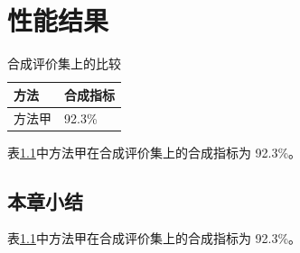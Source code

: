 \documentclass{ctexbook}
\begin{document}
\chapter{性能结果}
\begin{table}
\caption{合成评价集上的比较}
\label{tab:syn}
\begin{tabular}{ll}
方法 & 合成指标 \\
\hline
方法甲 & 92.3\% \\
\end{tabular}
\end{table}
表\ref{tab:syn}中方法甲在合成评价集上的合成指标为 92.3\%。
\section{本章小结}
表\ref{tab:syn}中方法甲在合成评价集上的合成指标为 92.3\%。
\end{document}

